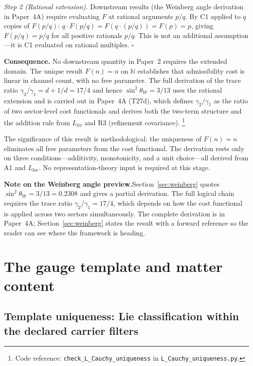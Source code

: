 \documentclass[11pt]{article}
\newcommand{\coderef}[2]{\footnote{Code reference: \texttt{#1} in \texttt{#2}.}}
\begin{document}
\begin{tcolorbox}[apfbox, title={Lemma $L_{\mathrm{Cauchy}}$ (Cost Function Uniqueness)}]
\textit{Step 2 (Rational extension).}  Downstream results (the Weinberg angle derivation in Paper~4A) require evaluating $F$ at rational arguments $p/q$.  By C1 applied to $q$ copies of $F(p/q)$: $q \cdot F(p/q) = F(q \cdot (p/q)) = F(p) = p$, giving $F(p/q) = p/q$ for all positive rationals $p/q$.  This is not an additional assumption---it is C1 evaluated on rational multiples.  $\square$

\smallskip\noindent\textbf{Consequence.}  No downstream quantity in Paper~2 requires the extended domain.  The unique result $F(n) = n$ on $\mathbb{N}$ establishes that admissibility cost is linear in channel count, with no free parameter.  The full derivation of the trace ratio $\gamma_2/\gamma_1 = d + 1/d = 17/4$ and hence $\sin^2\theta_W = 3/13$ uses the rational extension and is carried out in Paper~4A (T27d), which defines $\gamma_2/\gamma_1$ as the ratio of two sector-level cost functionals and derives both the two-term structure and the addition rule from $L_{\mathrm{irr}}$ and R3 (refinement covariance).
\coderef{check\_L\_Cauchy\_uniqueness}{L\_Cauchy\_uniqueness.py}
\end{tcolorbox}

The significance of this result is methodological: the uniqueness of $F(n) = n$ eliminates all free parameters from the cost functional.  The derivation rests only on three conditions---additivity, monotonicity, and a unit choice---all derived from A1 and $L_{\mathrm{loc}}$.  No representation-theory input is required at this stage.

\smallskip
\noindent\textbf{Note on the Weinberg angle preview.}\quad Section~\ref{sec:weinberg} quotes $\sin^2\theta_W = 3/13 = 0.2308$ and gives a partial derivation.  The full logical chain requires the trace ratio $\gamma_2/\gamma_1 = 17/4$, which depends on how the cost functional is applied across two sectors simultaneously.  The complete derivation is in Paper~4A; Section~\ref{sec:weinberg} states the result with a forward reference so the reader can see where the framework is heading.


\section{The gauge template and matter content}
\label{sec:gauge_template}

\subsection{Template uniqueness: Lie classification within the declared carrier filters}
\end{document}
